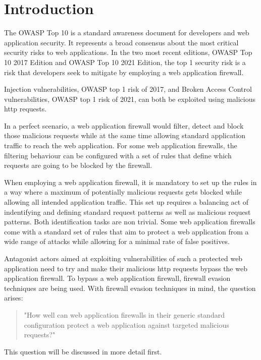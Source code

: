 \section{Introduction}
The OWASP Top 10 is a standard awareness document for developers and web application security. It represents a broad consensus about the most critical security risks to web applications.
In the two most recent editions, OWASP Top 10 2017 Edition and OWASP Top 10 2021 Edition, the top 1 security risk is a risk that developers seek to mitigate by employing a web application firewall. \cite{OWASP/Top10,OWASP/Risks2017,OWASP/Risks2021}

Injection vulnerabilities, OWASP top 1 risk of 2017, and Broken Access Control vulnerabilities, OWASP top 1 risk of 2021, can both be exploited using malicious \acrfull{http} requests. \cite{OWASP/Injection,OWASP/BrokenAccessControl}

In a perfect scenario, a web application firewall would filter, detect and block those malicious requests while at the same time allowing standard application traffic to reach the web application. 
For some web application firewalls, the filtering behaviour can be configured with a set of rules that define which requests are going to be blocked by the firewall. \cite{OWASP/CRS,wargio/naxsiRules,Cisco/SnortRulesDocs}


When employing a web application firewall, it is mandatory to set up the rules in a way where a maximum of potentially malicious requests gets blocked while allowing all intended application traffic. This set up requires a balancing act of indentifying and defining standard request patterns as well as malicious request patterns. Both identification tasks are non trivial. Some web application firewalls come with a standard set of rules that aim to protect a web application from a wide range of attacks while allowing for a minimal rate of false positives. \cite{OWASP/CRS,wargio/naxsiRules,Cisco/SnortRulesDownload}

Antagonist actors aimed at exploiting vulnerabilities of such a protected web application need to try and make their malicious \acrshort{http} requests bypass the web application firewall. To bypass a web application firewall, firewall evasion techniques are being used. \cite{HackTricks/WAFBypass} With firewall evasion techniques in mind, the question arises: 
\begin{quote} "How well can web application firewalls in their generic standard configuration protect a web application against targeted malicious requests?" 
\end{quote}
This question will be discussed in more detail first.
